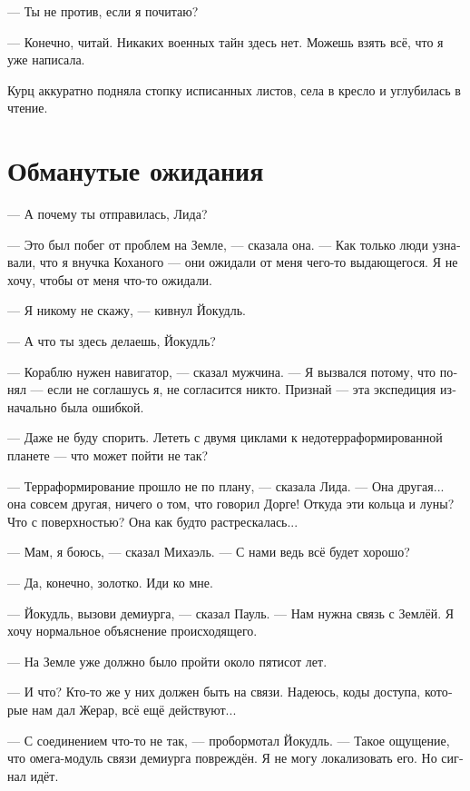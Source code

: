 \documentclass[a4paper,10pt,fleqn]{book}\usepackage{polyglossia}\setdefaultlanguage[babelshorthands=true]{russian}\setotherlanguage{english}\defaultfontfeatures{Ligatures=TeX,Mapping=tex-text}\usepackage{xcolor}\newcommand{\ml}[3]{#2}
\newcommand{\asterism}{\vspace{1em}{\centering\Large\bfseries$\ast~\ast~\ast$\par}\vspace{1em}}
\begin{document}
\ml{$0$}
{--- Ты не против, если я почитаю?}
{``Would you mind if I read?''}

--- Конечно, читай.
Никаких военных тайн здесь нет.
Можешь взять всё, что я уже написала.

Курц аккуратно подняла стопку исписанных листов, села в кресло и углубилась в чтение.

\section{Обманутые ожидания}

--- А почему ты отправилась, Лида?

--- Это был побег от проблем на Земле, --- сказала она.
--- Как только люди узнавали, что я внучка Коханого --- они ожидали от меня чего-то выдающегося.
Я не хочу, чтобы от меня что-то ожидали.

--- Я никому не скажу, --- кивнул Йокудль.

--- А что ты здесь делаешь, Йокудль?

--- Кораблю нужен навигатор, --- сказал мужчина.
--- Я вызвался потому, что понял --- если не соглашусь я, не согласится никто.
Признай --- эта экспедиция изначально была ошибкой.

--- Даже не буду спорить.
Лететь с двумя циклами к недотерраформированной планете --- что может пойти не так?

\asterism

--- Терраформирование прошло не по плану, --- сказала Лида.
--- Она другая... она совсем другая, ничего о том, что говорил Дорге!
Откуда эти кольца и луны?
Что с поверхностью?
Она как будто растрескалась...

--- Мам, я боюсь, --- сказал Михаэль.
--- С нами ведь всё будет хорошо?

--- Да, конечно, золотко.
Иди ко мне.

--- Йокудль, вызови демиурга, --- сказал Пауль.
--- Нам нужна связь с Землёй.
Я хочу нормальное объяснение происходящего.

--- На Земле уже должно было пройти около пятисот лет.

--- И что?
Кто-то же у них должен быть на связи.
Надеюсь, коды доступа, которые нам дал Жерар, всё ещё действуют...

\asterism

--- С соединением что-то не так, --- пробормотал Йокудль.
--- Такое ощущение, что омега-модуль связи демиурга повреждён.
Я не могу локализовать его.
Но сигнал идёт.
\end{document}
